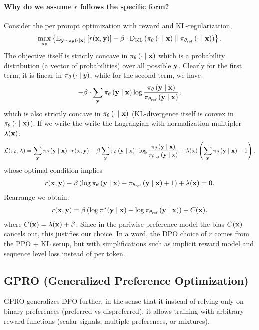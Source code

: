 \documentclass[11pt]{article}  %
\begin{document}
\paragraph{Why do we assume $r$ follows the specific form?}
Consider the per prompt optimization with reward and KL-regularization, 
\begin{align*}
  \max_{\pi_{\theta}} \left\{ \mathbb{E}_{\mathbf{y} \sim \pi_{\theta}\left( \cdot \mid \mathbf{x} \right)}\left[r(\mathbf{x}, \mathbf{y})\right] - \beta\cdot{\rm D}_{\text{KL}}\left( \pi_{\theta}\left( \cdot \mid \mathbf{x} \right) \parallel \pi_{\theta_{\text{ref}}}\left( \cdot \mid \mathbf{x} \right) \right) \right\}.
\end{align*}
The objective itself is strictly concave in $\pi_{\theta}\left( \cdot \mid \mathbf{x} \right)$ which is a probability distribution (a vector of probabilities) over all possible $\mathbf{y}$.
Clearly for the first term, it is linear in $\pi_{\theta}\left( \cdot \mid y \right)$, while for the second term, we have 
\begin{align*}
  -\beta\cdot\sum_{\mathbf{y}}\pi_{\theta}\left( \mathbf{y} \mid \mathbf{x} \right)\log\frac{\pi_{\theta}\left( \mathbf{y} \mid \mathbf{x} \right)}{\pi_{\theta_{\text{ref}}}\left( \mathbf{y} \mid \mathbf{x} \right)},
\end{align*} 
which is also strictly concave in $\pi_{\theta}\left( \cdot \mid \mathbf{x} \right)$ (KL-divergence itself is convex in $\pi_{\theta}\left( \cdot \mid \mathbf{x} \right)$).
If we write the write the Lagrangian with normalization muiltipler $\lambda(\mathbf{x})$:
\begin{align*}
  \mathcal{L}(\pi_\theta, \lambda) = \sum_{\mathbf{y}}\pi_{\theta}\left( \mathbf{y} \mid \mathbf{x} \right)\cdot r(\mathbf{x}, \mathbf{y})  - \beta \sum_{\mathbf{y}}\pi_{\theta}\left( \mathbf{y} \mid \mathbf{x} \right)\cdot\log \frac{\pi_{\theta}\left( \mathbf{y} \mid \mathbf{x} \right)}{\pi_{\theta_{\text{ref}}}\left( \mathbf{y} \mid \mathbf{x} \right)} + \lambda(\mathbf{x}) \left( \sum_{\mathbf{y}}\pi_{\theta}\left( \mathbf{y} \mid \mathbf{x} \right) - 1 \right),
\end{align*}
whose optimal condition implies 
\begin{align*}
  r(\mathbf{x}, \mathbf{y}) - \beta\left( \log \pi_{\theta}\left( \mathbf{y} \mid \mathbf{x} \right) - \pi_{\theta_{\text{ref}}}\left( \mathbf{y} \mid \mathbf{x} \right) + 1 \right) + \lambda(\mathbf{x}) = 0.
\end{align*}
Rearrange we obtain: 
\begin{align*}
  r(\mathbf{x}, \mathbf{y}) = \beta\left( \log\pi^\star(\mathbf{y}\mid\mathbf{x}) - \log\pi_{\theta_{\text{ref}}}\left( \mathbf{y} \mid \mathbf{x} \right) \right) + C(\mathbf{x}).
\end{align*}
where $C(\mathbf{x}) = \lambda(\mathbf{x}) + \beta$.
Since in the pariwise preference model the bias $C(\mathbf{x})$ cancels out, this justifies our choice. 
In a word, the DPO choice of $r$ comes from the PPO + KL setup, but with simplifications such as implicit reward model and sequence level loss instead of per token.


\subsection{GPRO (Generalized Preference Optimization)}
GPRO generalizes DPO further, in the sense that it instead of relying only on binary preferences (preferred vs dispreferred), it allows training with arbitrary reward functions (scalar signals, multiple preferences, or mixtures).
\end{document}
